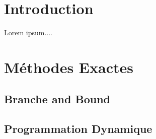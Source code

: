 \documentclass[class=article, crop=false]{standalone}
\begin{document}
    \section{Introduction}
    Lorem ipsum....
    \section{Méthodes Exactes}
    \subsection{Branche and Bound}
    \subsection{Programmation Dynamique}
\end{document}
